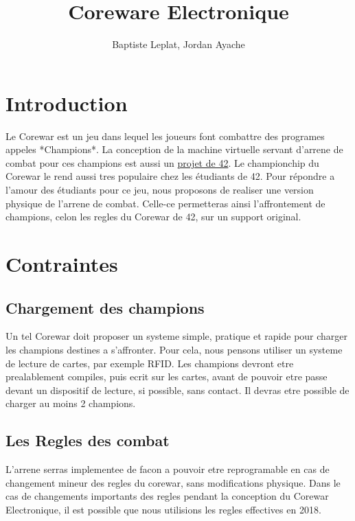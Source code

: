 \documentclass[12pt,a4paper,titlepage]{article}
\title{Coreware Electronique}
\date{}
\author{Baptiste Leplat, Jordan Ayache}
\begin{document}
    \maketitle
    \tableofcontents

      \section{Introduction}

Le Corewar est un jeu dans lequel les joueurs font combattre des programes appeles *Champions*.
La conception de la machine virtuelle servant d'arrene de combat pour ces champions est aussi un \href{https://projects.intra.42.fr/projects/corewar}{projet de 42}.  
Le championchip du Corewar le rend aussi tres populaire chez les étudiants de 42. Pour répondre a l'amour des étudiants pour ce jeu, nous proposons de realiser une version physique de l'arrene de combat. Celle-ce permetteras ainsi l'affrontement de champions, celon les regles du Corewar de 42, sur un support original.  

      \section{Contraintes}

        \subsection{Chargement des champions}

Un tel Corewar doit proposer un systeme simple, pratique et rapide pour charger les champions destines a s'affronter.  
Pour cela, nous pensons utiliser un systeme de lecture de cartes, par exemple RFID.
Les champions devront etre prealablement compiles, puis ecrit sur les cartes, avant de pouvoir etre passe devant un dispositif de lecture, si possible, sans contact.  
Il devras etre possible de charger au moins 2 champions.  

        \subsection{Les Regles des combat}

L'arrene serras implementee de facon a pouvoir etre reprogramable en cas de changement mineur des regles du corewar, sans modifications physique.  
Dans le cas de changements importants des regles pendant la conception du Corewar Electronique, il est possible que nous utilisions les regles effectives en 2018.  
\end{document}
